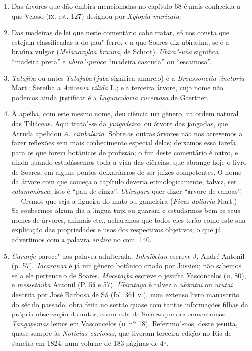 \begin{enumerate}
\item  Das árvores que dão embira mencionadas no capítulo 68 é mais conhecida a que 
Veloso (\textsc{ix}. est. 127) designou por \textit{Xylopia muricata}.

\item Das madeiras de lei que neste comentário cabe tratar, só nos consta que estejam 
classificadas a do pau"-ferro, e a que Soares diz ubiraúna, se é a braúna vulgar  
(\textit{Melanoxylon brauna}, de Schott). \textit{Ubira"-una} significa ``madeira  preta''  e 
\textit{ubira"-piroca} ``madeira cascuda'' ou ``escamosa''. 

\item \textit{Tatajiba} ou antes \textit{Tatajuba} (\textit{juba} significa amarelo) é a \textit{Broussonetia tinctoria} 
Mart.; Sereíba a \textit{Avicenia nilida} L.; e a terceira árvore, cujo nome não podemos 
ainda justificar é a \textit{Laguncularia rucemosa} de Gaertner.

\item À apeíba, com este mesmo nome, deu ciência um gênero, na ordem natural das  Tiliáceas. 
Aqui trata"-se da \textit{jangadeira}, ou árvore das jangadas, que Arruda apelidou \textit{A. cimbalaria}. 
Sobre as outras árvores não nos atrevemos a fazer reflexões sem mais 
conhecimento especial delas; deixamos essa tarefa para os que forem botânicos de 
profissão; o fim deste comentário é outro, e ainda quando estudássemos toda a vida das 
ciências, que abrange hoje o livro de Soares, em alguns pontos deixaríamos de ser 
juízes competentes. O nome da árvore com que começa o capítulo deveria 
etimologicamente, talvez, ser \textit{calamimbuca}, isto é ``pau de cinza''. 
\textit{Ubiragara} quer dizer ``árvore de canoas''.  --- Cremos que seja a figueira do mato ou 
gameleira (\textit{Ficus doliaria} Mart.) --- Se soubermos algum dia a língua tupi ou guarani e 
estudarmos bem os seus nomes de árvores, animais etc., acharemos que todos eles terão 
como este sua explicação das propriedades e usos dos respectivos objetivos; o que já 
advertimos com a palavra \textit{andira} no com. 140.

\item  \textit{Carunje} parece"-nos palavra adulterada. \textit{Inhuibatan} escreve J. André
Antonil (p. 57). \textit{Jacaranda} é já um gênero botânico criado por Jussieu; não
sabemos se a ele pertence o de Soares. \textit{Mocetayba} escreve o jesuíta Vasconcelos
(\textsc{ii}, 80), e \textit{messetaúba} Antonil (P. 56 e 57). \textit{Ubirataya} é talvez 
a \textit{ubiratai} ou \textit{urutai} descrita por José Barbosa de Sá (fol. 361 v.), num extenso livro 
manuscrito do século passado, obra feita no sertão quase com tantas informações filhas 
da própria observação do autor, como esta de Soares que ora comentamos. \textit{Tangapemas} 
lemos em Vasconcelos (\textsc{ii}, nº 18). Referimo"-nos, deste jesuíta, quase sempre às  
\textit{Notícias curiosas}, que tiveram terceira edição no Rio de Janeiro em 1824, num volume 
de 183 páginas de 4º.


\end{enumerate}

